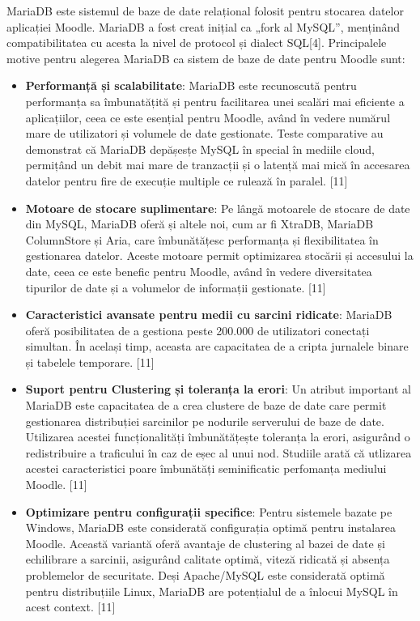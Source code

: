 MariaDB este sistemul de baze de date relațional folosit pentru stocarea datelor aplicației Moodle. MariaDB a fost creat inițial ca „fork al MySQL”, menținând compatibilitatea cu 
acesta la nivel de protocol și dialect SQL[4]. Principalele motive pentru alegerea MariaDB ca sistem de baze de date pentru Moodle sunt:
\begin{itemize}
    \item \textbf{Performanță și scalabilitate}: MariaDB este recunoscută pentru performanța sa îmbunatățită și pentru facilitarea unei scalări mai eficiente a aplicațiilor, 
    ceea ce este esențial pentru Moodle, având în vedere numărul mare de utilizatori și volumele de date gestionate. Teste comparative au demonstrat că MariaDB depășesțe MySQL în
    special în mediile cloud, permițând un debit mai mare de tranzacții și o latență mai mică în accesarea datelor pentru fire de execuție multiple ce rulează în paralel. [11]
    \item \textbf{Motoare de stocare suplimentare}: Pe lângă motoarele de stocare de date din MySQL, MariaDB oferă și altele noi, cum ar fi XtraDB, MariaDB ColumnStore și Aria,
    care îmbunătățesc performanța și flexibilitatea în gestionarea datelor. Aceste motoare permit optimizarea stocării și accesului la date, ceea ce este benefic pentru Moodle,
    având în vedere diversitatea tipurilor de date și a volumelor de informații gestionate. [11]
    \item \textbf{Caracteristici avansate pentru medii cu sarcini ridicate}: MariaDB oferă posibilitatea de a gestiona peste 200.000 de utilizatori conectați simultan. În același timp, 
    aceasta are capacitatea de a cripta jurnalele binare și tabelele temporare. [11]
    \item \textbf{Suport pentru Clustering și toleranța la erori}: Un atribut important al MariaDB este capacitatea de a crea clustere de baze de date care permit gestionarea distribuției 
    sarcinilor pe nodurile serverului de baze de date. Utilizarea acestei funcționalități îmbunătățește toleranța la erori, asigurând o redistribuire a traficului în caz de eșec al unui 
    nod. Studiile arată că utlizarea acestei caracteristici poare îmbunătăți seminificatic perfomanța mediului Moodle. [11]
    \item \textbf{Optimizare pentru configurații specifice}: Pentru sistemele bazate pe Windows, MariaDB este considerată configurația optimă pentru instalarea Moodle. Această variantă 
    oferă avantaje de clustering al bazei de date și echilibrare a sarcinii, asigurând calitate optimă, viteză ridicată și absența problemelor de securitate. Deși Apache/MySQL este 
    considerată optimă pentru distribuțiile Linux, MariaDB are potențialul de a înlocui MySQL în acest context. [11]
\end{itemize}

